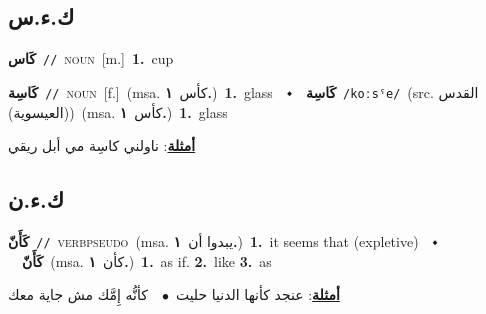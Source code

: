\documentclass[10pt,a4paper,twoside]{article} %
\begin{document}
\begin{multicols}{2}
\vspace{-3mm}
\subsection*{\color{blue}\foreignlanguage{arabic}{ك.ء.س}\color{blue}{}} 

{\setlength\topsep{0pt}\textbf{\foreignlanguage{arabic}{كَاس}}\ {\color{gray}\texttt{//}\color{black}}\ \textsc{noun}\ [m.]\ \textbf{1.}~cup\ } \vspace{2mm}

{\setlength\topsep{0pt}\textbf{\foreignlanguage{arabic}{كَاسِة}}\ {\color{gray}\texttt{//}\color{black}}\ \textsc{noun}\ [f.]\ \color{gray}(msa. \foreignlanguage{arabic}{كأس}~\foreignlanguage{arabic}{\textbf{١.}})\color{black}\ \textbf{1.}~glass\ \ $\smblkdiamond$\ \ \setlength\topsep{0pt}\textbf{\foreignlanguage{arabic}{كَاسِة}}\ {\color{gray}\texttt{/koːsˤe/}\color{black}}\ (src. \color{gray}\foreignlanguage{arabic}{القدس (العيسوية)}\color{black})\ \color{gray}(msa. \foreignlanguage{arabic}{كأس}~\foreignlanguage{arabic}{\textbf{١.}})\color{black}\ \textbf{1.}~glass\  \begin{flushright}\color{gray}\foreignlanguage{arabic}{\textbf{\underline{\foreignlanguage{arabic}{أمثلة}}}: ناولني كاسِة مي أبل ريقي}\end{flushright}\color{black}} \vspace{2mm}

\vspace{-3mm}
\subsection*{\color{blue}\foreignlanguage{arabic}{ك.ء.ن}\color{blue}{ (ntws)}} 

{\setlength\topsep{0pt}\textbf{\foreignlanguage{arabic}{كَأَنّ}}\ {\color{gray}\texttt{//}\color{black}}\ \textsc{verb\textunderscore pseudo}\ \color{gray}(msa. \foreignlanguage{arabic}{يبدوا أن}~\foreignlanguage{arabic}{\textbf{١.}})\color{black}\ \textbf{1.}~it seems that (expletive)\ \ $\smblkdiamond$\ \ \setlength\topsep{0pt}\textbf{\foreignlanguage{arabic}{كَأَنّ}}\ \color{gray}(msa. \foreignlanguage{arabic}{كأن}~\foreignlanguage{arabic}{\textbf{١.}})\color{black}\ \textbf{1.}~as if.  \textbf{2.}~like  \textbf{3.}~as\  \begin{flushright}\color{gray}\foreignlanguage{arabic}{\textbf{\underline{\foreignlanguage{arabic}{أمثلة}}}: عنجد كأنها الدنيا حليت\ $\bullet$\ \  كأنُّه إِمَّك مش جاية معك}\end{flushright}\color{black}} \vspace{2mm}


\end{multicols}
\end{document}

